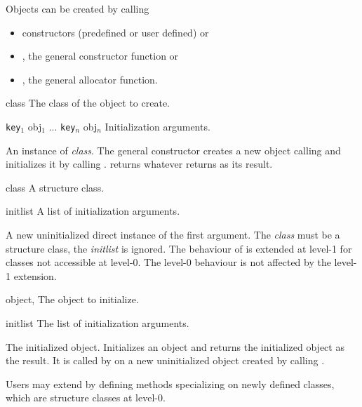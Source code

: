 \begin{optDefinition}
Objects can be created by calling
%
\begin{itemize}
    \item constructors (predefined or user defined) or
    \item {}, the general constructor function or
    \item {}, the general allocator function.
\end{itemize}

%
\begin{arguments}
    \item[class] The class of the object to create.
    \item[{\tt key$_1$} obj$_1$ ... {\tt key$_n$} obj$_n$] Initialization
    arguments.
\end{arguments}
%
\result%
An instance of {\em class}.
%
\remarks%
The general constructor  creates a new object calling
 and initializes it by calling
.  returns whatever
 returns as its result.

%
\begin{arguments}
    \item[class] A structure class.
    \item[initlist] A list of initialization arguments.
\end{arguments}
%
\result%
A new uninitialized direct instance of the first argument.
%
\remarks%
The {\em class\/} must be a structure class, the {\em initlist\/} is ignored.
The behaviour of  is extended at level-1 for classes not
accessible at level-0. The level-0 behaviour is not affected by the
level-1 extension.

%
\begin{genericargs}
    \item[object, \classref{object}] The object to initialize.
    \item[initlist] The list of initialization arguments.
\end{genericargs}
%
\result%
The initialized object.
%
\remarks%
Initializes an object and returns the initialized object as the result.  It is
called by  on a new uninitialized object created by calling
.

Users may extend  by defining methods specializing on
newly defined classes, which are structure classes at level-0.


\end{optDefinition}
